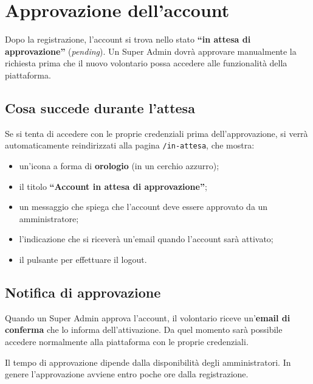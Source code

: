 \documentclass[a4paper,11pt,oneside]{book}
\newcommand{\pulsante}[1]{\fcolorbox{namoCharcoal}{namoGray}{\small\textsf{\textbf{#1}}}}
\newcommand{\percorso}[1]{\textcolor{namoCyan}{\texttt{#1}}}
\begin{document}
\section{Approvazione dell'account}
\label{sec:approvazione-account}

Dopo la registrazione, l'account si trova nello stato \textbf{``in attesa di approvazione''} (\textit{pending}). Un Super Admin dovr\`a approvare manualmente la richiesta prima che il nuovo volontario possa accedere alle funzionalit\`a della piattaforma.

\subsection{Cosa succede durante l'attesa}

Se si tenta di accedere con le proprie credenziali prima dell'approvazione, si verr\`a automaticamente reindirizzati alla pagina \percorso{/in-attesa}, che mostra:

\begin{itemize}[leftmargin=1.5em]
  \item un'icona a forma di \textbf{orologio} (in un cerchio azzurro);
  \item il titolo \textbf{``Account in attesa di approvazione''};
  \item un messaggio che spiega che l'account deve essere approvato da un amministratore;
  \item l'indicazione che si ricever\`a un'email quando l'account sar\`a attivato;
  \item il pulsante \pulsante{Esci} per effettuare il logout.
\end{itemize}

\subsection{Notifica di approvazione}

Quando un Super Admin approva l'account, il volontario riceve un'\textbf{email di conferma} che lo informa dell'attivazione. Da quel momento sar\`a possibile accedere normalmente alla piattaforma con le proprie credenziali.

\begin{infobox}
Il tempo di approvazione dipende dalla disponibilit\`a degli amministratori. In genere l'approvazione avviene entro poche ore dalla registrazione.
\end{infobox}
\end{document}
